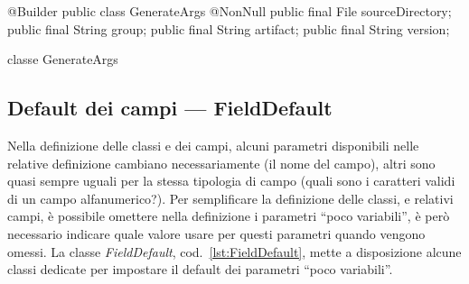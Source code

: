 \documentclass[a4paper,10pt]{report}
\newif\ifesource
\newenvironment{elisting}[1][!htb]
  {\captionsetup{aboveskip=0pt}\begin{listing}[#1]}
  {\end{listing}%
}
\begin{document}
\ifesource
\begin{figure*}[!htb]
\begin{lstlisting}[language=java, caption=classe GenerateArgs, 
label=lst:GenerateArgs]
@Builder
public class GenerateArgs {
    @NonNull public final File sourceDirectory;
    public final String group;
    public final String artifact;
    public final String version;
}
\end{lstlisting}\index{GenerateArgs}
\end{figure*}
\else
\begin{elisting}
\begin{javacode}
@Builder
public class GenerateArgs {
    @NonNull public final File sourceDirectory;
    public final String group;
    public final String artifact;
    public final String version;
}
\end{javacode}
\caption{classe GenerateArgs}
\label{lst:GenerateArgs}
\end{elisting}
\fi

\subsection{Default dei campi --- FieldDefault}
Nella definizione delle classi e dei campi, alcuni parametri disponibili nelle
relative definizione cambiano necessariamente (il nome del campo), altri sono
quasi sempre uguali per la stessa tipologia di campo (quali sono i caratteri
validi di un campo alfanumerico?).
Per semplificare la definizione delle classi, e relativi campi, è possibile
omettere nella definizione i parametri ``poco variabili'', è però necessario
indicare quale valore usare per questi parametri quando vengono omessi.
La classe \textsl{FieldDefault}, cod.~\ref{lst:FieldDefault}, mette a 
disposizione alcune classi dedicate per impostare il default dei parametri 
``poco variabili''.
\end{document}
